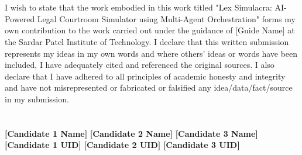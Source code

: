 \documentclass[12pt,singleside,a4paper]{article}
\begin{document}

%
%

\section*{}

\vspace{3.5cm}
I wish to state that the work embodied in this work titled "Lex Simulacra: AI-Powered Legal Courtroom Simulator using Multi-Agent Orchestration" forms my own contribution to the work carried out under the guidance of [Guide Name] at the Sardar Patel Institute of Technology. I declare that this written submission represents my ideas in my own words and where others' ideas or words have been included, I have adequately cited and referenced the original sources. I also declare that I have adhered to all principles of academic honesty and integrity and have not misrepresented or fabricated or falsified any idea/data/fact/source in my submission.
\\
\\
\\
\textbf{[Candidate 1 Name]} \hspace{2cm} \textbf{[Candidate 2 Name]} \hspace{2cm} \textbf{[Candidate 3 Name]}\\ 
\vspace{4cm}
\textbf{[Candidate 1 UID]} \hspace{3cm} \textbf{[Candidate 2 UID]} \hspace{2cm} \textbf{[Candidate 3 UID]}\\ 
\vspace{1cm}

\pagebreak
\end{document}
